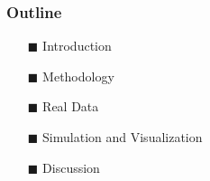 \begin{frame}
    \frametitle{Outline}
    
    
    \begin{itemize}
    
      \item[$\blacksquare$] Introduction
    
      \vspace{5mm}
    
      \item[$\blacksquare$] Methodology
    
    
     \vspace{5mm}
    
     \item[$\blacksquare$] Real Data
    
      \vspace{5mm}
    
      \item[$\blacksquare$] Simulation and Visualization
    
      \vspace{5mm}
    
     \item[$\blacksquare$] Discussion
    
    
    
    \end{itemize}
\end{frame}
    